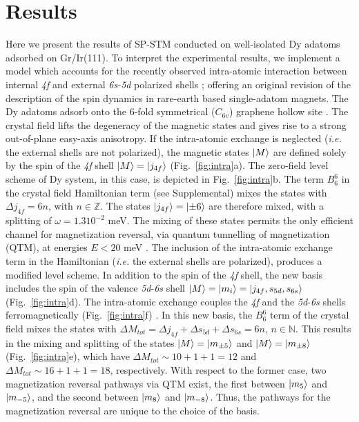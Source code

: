 \documentclass[
reprint,amsmath,amssymb,aps]{revtex4-2}
\begin{document}
\section{Results}
Here we present the results of SP-STM conducted on well-isolated Dy adatoms adsorbed on Gr/Ir(111). To interpret the experimental results, we implement a model which accounts for the recently observed intra-atomic interaction between internal \textit{4f} and external \textit{6s-5d} polarized shells \cite{pivetta2020}; offering an original revision of the description of the spin dynamics in rare-earth based single-adatom magnets. The Dy adatoms adsorb onto the 6-fold symmetrical ($C_{6v}$) graphene hollow site \cite{baltic2018}. The crystal field lifts the degeneracy of the magnetic states and gives rise to a strong out-of-plane easy-axis anisotropy.
If the intra-atomic exchange is neglected (\textit{i.e.} the external shells are not polarized), the magnetic states $\ket{M}$ are defined solely by the spin of the \textit{4f} shell $\ket{M}=\ket{j_{4f}}$ (Fig.~\ref{fig:intra}a). The zero-field level scheme of Dy system, in this case, is depicted in Fig.~\ref{fig:intra}b. The term $B_6^6$ in the crystal field Hamiltonian term (see Supplemental) mixes the states with $\Delta j_{4f}=6n$, with $n\in \mathbb{Z}$. The states $\ket{j_{4f}}=\ket{\pm 6}$ are therefore mixed, with a splitting of $\omega=1.3 10^{-2}$ meV. The mixing of these states permits the only efficient channel for magnetization reversal, via quantum tunnelling of magnetization (QTM), at energies $E<20$ meV \citep{baltic2016}. The inclusion of the intra-atomic exchange term in the Hamiltonian (\textit{i.e.} the external shells are polarized), produces a modified level scheme. In addition to the spin of the \textit{4f} shell, the new basis includes the spin of the valence \textit{5d}-\textit{6s} shell $\ket{M}=\ket{m_i}=\ket{j_{4f},s_{5d},s_{6s}}$ (Fig.~\ref{fig:intra}d). The intra-atomic exchange couples the \textit{4f} and the \textit{5d}-\textit{6s} shells ferromagnetically (Fig.~\ref{fig:intra}f) \cite{pivetta2020}. 
In this new basis, the $B_6^6$ term of the crystal field mixes the states with $\Delta M_{tot}=\Delta j_{4f} + \Delta s_{5d} + \Delta s_{6s}=6n$, $n\in \mathbb{N}$. This results in the mixing and splitting of the states $\ket{M}=\ket{m_{\pm 5}}$ and $\ket{M}=\ket{m_{\pm 8}}$ (Fig.~\ref{fig:intra}e), which have $\Delta M_{tot}\sim 10+1+1 = 12$ and $\Delta M_{tot}\sim 16 +1+1=18$, respectively. With respect to the former case, two magnetization reversal pathways via QTM exist, the first between $\ket{m_{5}}$ and $\ket{m_{-5}}$, and the second between $\ket{m_{8}}$ and $\ket{m_{-8}}$. Thus, the pathways for the magnetization reversal are unique to the choice of the basis. 
\end{document}
